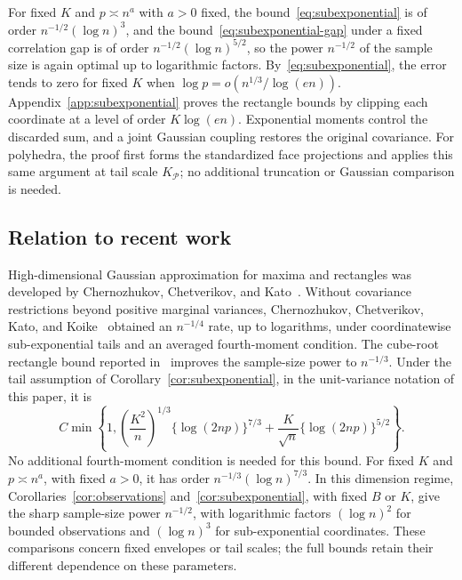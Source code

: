 \documentclass[11pt,letterpaper]{article}
\theoremstyle{remark}
\begin{document}
For fixed \(K\) and \(p\asymp n^a\) with \(a>0\) fixed, the
bound~\eqref{eq:subexponential} is of order \(n^{-1/2}(\log n)^3\), and the
bound~\eqref{eq:subexponential-gap} under a fixed correlation gap is of order
\(n^{-1/2}(\log n)^{5/2}\), so the power \(n^{-1/2}\) of the sample size is
again optimal up to logarithmic factors. By~\eqref{eq:subexponential}, the error
tends to zero for fixed \(K\) when \(\log p=o(n^{1/3}/\log(en))\).
Appendix~\ref{app:subexponential} proves the rectangle bounds by
clipping each coordinate at a level of order \(K\log(en)\).
Exponential moments control the discarded sum, and a joint Gaussian
coupling restores the original covariance. For polyhedra, the proof
first forms the standardized face projections and applies this same
argument at tail scale \(K_{\mathcal P}\); no additional truncation
or Gaussian comparison is needed.

\subsection{Relation to recent work}\label{sec:literature}
High-dimensional Gaussian approximation for maxima and rectangles was
developed by Chernozhukov, Chetverikov, and Kato~\cite{CCK2013,CCK2017}.
Without covariance restrictions beyond positive marginal variances,
Chernozhukov, Chetverikov, Kato, and Koike~\cite[Theorem~2.1]{CCKK2022}
obtained an \(n^{-1/4}\) rate, up to logarithms, under coordinatewise
sub-exponential tails and an averaged fourth-moment condition.
The cube-root rectangle bound reported in~\cite[Theorem~1 and Section~5]{GaoZhang} improves the sample-size power to \(n^{-1/3}\). Under the tail assumption of Corollary~\ref{cor:subexponential}, in the unit-variance notation of this paper, it is
\begin{equation*}
 C\min\left\{1,
 \left(\frac{K^2}{n}\right)^{1/3}\{\log(2np)\}^{7/3}
 +\frac K{\sqrt n}\{\log(2np)\}^{5/2}\right\}.
\end{equation*}
No additional fourth-moment condition is needed for this bound.
For fixed \(K\) and \(p\asymp n^a\), with fixed \(a>0\), it has
order \(n^{-1/3}(\log n)^{7/3}\). In this dimension regime,
Corollaries~\ref{cor:observations} and~\ref{cor:subexponential}, with
fixed \(B\) or \(K\), give the sharp sample-size power
\(n^{-1/2}\), with logarithmic factors \((\log n)^2\) for bounded
observations and \((\log n)^3\) for sub-exponential coordinates.
These comparisons concern fixed envelopes or tail scales; the full
bounds retain their different dependence on these parameters.
\end{document}
